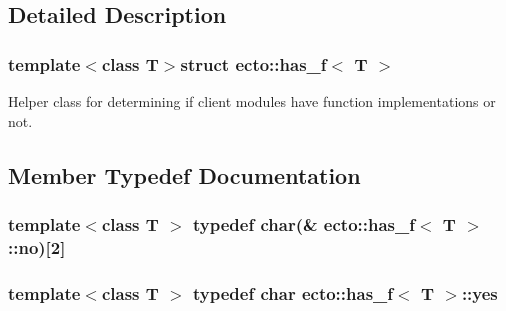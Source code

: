 \subsection{Detailed Description}
\subsubsection*{template$<$class T$>$struct ecto\+::has\+\_\+f$<$ T $>$}

Helper class for determining if client modules have function implementations or not. 

\subsection{Member Typedef Documentation}
\hypertarget{structecto_1_1has__f_ae0c6da775cf20caed616e24681af2807}{}
\subsubsection[{no}]{\setlength{\rightskip}{0pt plus 5cm}template$<$class T $>$ typedef char(\& {\bf ecto\+::has\+\_\+f}$<$ T $>$\+::no)\mbox{[}2\mbox{]}}\label{structecto_1_1has__f_ae0c6da775cf20caed616e24681af2807}
\hypertarget{structecto_1_1has__f_a3fb902f1eed02919195aff1a6b28eb76}{}
\subsubsection[{yes}]{\setlength{\rightskip}{0pt plus 5cm}template$<$class T $>$ typedef char {\bf ecto\+::has\+\_\+f}$<$ T $>$\+::{\bf yes}}\label{structecto_1_1has__f_a3fb902f1eed02919195aff1a6b28eb76}


